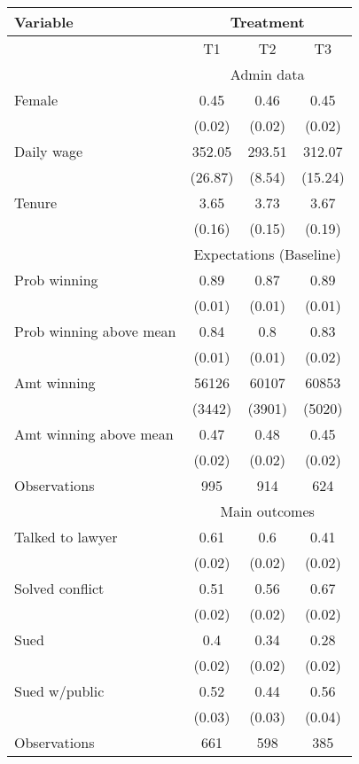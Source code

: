 \begin{tabular}{lccc}
\toprule
Variable & \multicolumn{3}{c}{Treatment} \\
\midrule
\midrule
      & T1    & T2    & T3 \\
\midrule
      & \multicolumn{3}{c}{Admin data} \\
\midrule
\midrule
Female & 0.45  & 0.46  & 0.45 \\
      & (0.02) & (0.02) & (0.02) \\
Daily wage & 352.05 & 293.51 & 312.07 \\
      & (26.87) & (8.54) & (15.24) \\
Tenure & 3.65  & 3.73  & 3.67 \\
      & (0.16) & (0.15) & (0.19) \\
\midrule
      & \multicolumn{3}{c}{Expectations (Baseline)} \\
\midrule
\midrule
Prob winning & 0.89  & 0.87  & 0.89 \\
      & (0.01) & (0.01) & (0.01) \\
Prob winning above mean & 0.84  & 0.8   & 0.83 \\
      & (0.01) & (0.01) & (0.02) \\
Amt winning & 56126 & 60107 & 60853 \\
      & (3442) & (3901) & (5020) \\
Amt winning above mean & 0.47  & 0.48  & 0.45 \\
      & (0.02) & (0.02) & (0.02) \\
\midrule
Observations & 995   & 914   & 624 \\
\midrule
      & \multicolumn{3}{c}{Main outcomes} \\
\midrule
\midrule
Talked to lawyer & 0.61  & 0.6   & 0.41 \\
      & (0.02) & (0.02) & (0.02) \\
Solved conflict & 0.51  & 0.56  & 0.67 \\
      & (0.02) & (0.02) & (0.02) \\
Sued  & 0.4   & 0.34  & 0.28 \\
      & (0.02) & (0.02) & (0.02) \\
Sued w/public & 0.52  & 0.44  & 0.56 \\
      & (0.03) & (0.03) & (0.04) \\
\midrule
Observations & 661   & 598   & 385 \\
\bottomrule
\bottomrule
\end{tabular}%
